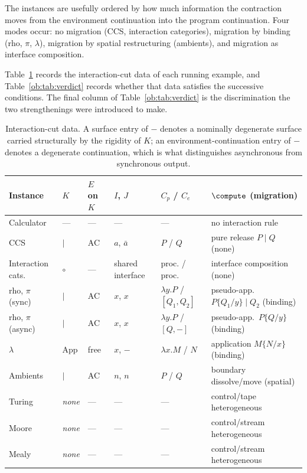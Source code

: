 \begin{remark}
\label{ob:rem:migration}
The instances are usefully ordered by how much information the contraction moves from
the environment continuation into the program continuation. Four modes occur: no
migration (CCS, interaction categories), migration by binding (rho, $\pi$, $\lambda$),
migration by spatial restructuring (ambients), and migration as interface composition.
\end{remark}

Table~\ref{ob:tab:cut} records the interaction-cut data of each running example, and
Table~\ref{ob:tab:verdict} records whether that data satisfies the successive conditions.
The final column of Table~\ref{ob:tab:verdict} is the discrimination the two strengthenings
were introduced to make.

\begin{table}[t]
\footnotesize
\centering
\begin{tabular}{@{}lllllp{34mm}@{}}
\toprule
\textbf{Instance} & \textbf{$K$} & \textbf{$E$ on $K$} & \textbf{$I$, $J$} &
\textbf{$C_p$ / $C_e$} & \textbf{$\compute$ (migration)} \\
\midrule
Calculator & --- & --- & --- & --- & no interaction rule \\[2pt]
CCS & ${\mid}$ & AC & $a$, $\bar a$ & $P$ / $Q$ &
  pure release $P \mid Q$ (none) \\[2pt]
Interaction cats. & $\circ$ & --- & shared interface & proc. / proc. &
  interface composition (none) \\[2pt]
rho, $\pi$ (sync) & ${\mid}$ & AC & $x$, $x$ & $\lambda y.P$ / $[Q_1,Q_2]$ &
  pseudo-app.\ $P\{Q_1/y\} \mid Q_2$ (binding) \\[2pt]
rho, $\pi$ (async) & ${\mid}$ & AC & $x$, $x$ & $\lambda y.P$ / $[Q,-]$ &
  pseudo-app.\ $P\{Q/y\}$ (binding) \\[2pt]
$\lambda$ & $\mathrm{App}$ & free & $x$, $-$ & $\lambda x.M$ / $N$ &
  application $M\{N/x\}$ (binding) \\[2pt]
Ambients & ${\mid}$ & AC & $n$, $n$ & $P$ / $Q$ &
  boundary dissolve/move (spatial) \\[2pt]
\midrule
Turing & \emph{none} & --- & --- & --- & control/tape heterogeneous \\[2pt]
Moore & \emph{none} & --- & --- & --- & control/stream heterogeneous \\[2pt]
Mealy & \emph{none} & --- & --- & --- & control/stream heterogeneous \\
\bottomrule
\end{tabular}
\caption{Interaction-cut data. A surface entry of $-$ denotes a nominally degenerate
surface carried structurally by the rigidity of $K$; an environment-continuation entry
of $-$ denotes a degenerate continuation, which is what distinguishes asynchronous from
synchronous output.}
\label{ob:tab:cut}
\end{table}

